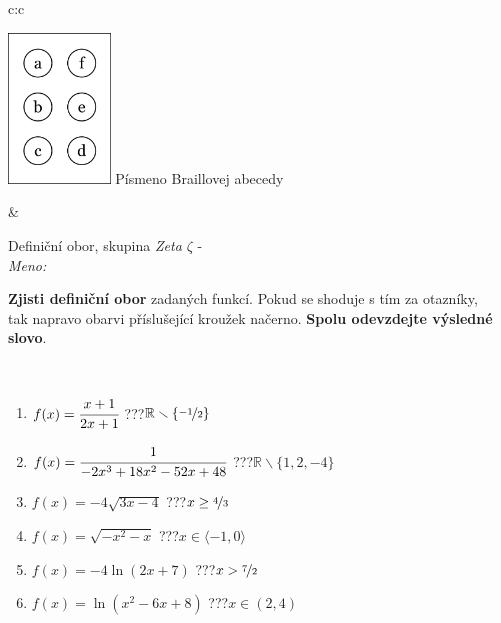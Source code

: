 \documentclass[10pt]{report}
\begin{document}
\begin{tabular}{c:c}
\begin{minipage}[c][104.5mm][t]{0.5\linewidth}
\begin{center}
\begin{minipage}{0.20\linewidth}
\begin{center}
\includegraphics[height=40mm]{../images/braille.png}
{\small Písmeno Braillovej abecedy}
\end{center}
\end{minipage}
\end{center}
\end{minipage}
&
\begin{minipage}[c][104.5mm][t]{0.5\linewidth}
\begin{center}
\vspace{7mm}
{\huge Definiční obor, skupina \textit{Zeta $\zeta$} -}\\[5mm]
\textit{Meno:}\phantom{xxxxxxxxxxxxxxxxxxxxxxxxxxxxxxxxxxxxxxxxxxxxxxxxxxxxxxxxxxxxxxxxx}\\[5mm]
\begin{minipage}{0.95\linewidth}
\textbf{Zjisti definiční obor} zadaných funkcí. Pokud se shoduje s tím za otazníky,\\tak napravo obarvi příslušející kroužek načerno. \textbf{Spolu odevzdejte výsledné slovo}.
\end{minipage}
\\[1mm]
\begin{minipage}{0.79\linewidth}
\begin{center}
\begin{varwidth}{\linewidth}
\begin{enumerate}
\normalsizerrr
\item $f(x)=\cfrac{x+1}{2x+1}$\quad \dotfill\; ???\;\dotfill \quad $\mathbb{R}\smallsetminus\{\nicefrac{-1}{2}\}$
\item $f(x)=\cfrac{1}{-2x^3+18x^2-52x+48}$\quad \dotfill\; ???\;\dotfill \quad $\mathbb{R}\smallsetminus\{1,2,-4\}$
\item $f(x)=-4\sqrt{3x-4}$\quad \dotfill\; ???\;\dotfill \quad $x\geq\nicefrac{4}{3}$
\item $f(x)=\sqrt{-x^2-x}$\quad \dotfill\; ???\;\dotfill \quad $x\in\langle-1 , 0\rangle$
\item $f(x)=-4\ln{(2x+7)}$\quad \dotfill\; ???\;\dotfill \quad $x>\nicefrac{7}{2}$
\item $f(x)=\ln{(x^2-6x+8)}$\quad \dotfill\; ???\;\dotfill \quad $x\in(2 , 4)$

\end{enumerate}
\end{varwidth}
\end{center}
\end{minipage}
\end{center}
\end{minipage}
\end{tabular}
\end{document}
